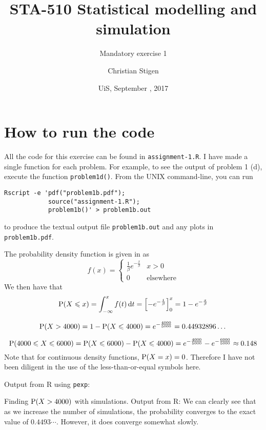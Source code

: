 \documentclass[a4paper,english,12pt]{article}
\title{STA-510 Statistical modelling and simulation}
\subtitle{Mandatory exercise 1}
\author{Christian Stigen}
\date{UiS, September \nth{21}, 2017}
\begin{document}
\maketitle


\section*{\normalsize{How to run the code}}
All the code for this exercise can be found in \texttt{assignment-1.R}. I have
made a single function for each problem. For example, to see the output of
problem 1 (d), execute the function \texttt{problem1d()}.  From the UNIX
command-line, you can run
\begin{verbatim}
Rscript -e 'pdf("problem1b.pdf");
            source("assignment-1.R");
            problem1b()' > problem1b.out
\end{verbatim}
to produce the textual output file \texttt{problem1b.out} and
any plots in \texttt{problem1b.pdf}.

The probability density function is given in \cite{walpole} as
\[
  f(x) =
    \begin{cases}
      \displaystyle
        \frac{1}{\beta} e^{-\frac{x}{\beta}} & x > 0  \\
        0 & \text{elsewhere}
    \end{cases}
\]
We then have that
\[
  \mathrm{P}(X \leqslant x) = \int_{-\infty}^{x} f(t)\, \mathrm{d}t 
    = \left[ -e^{-\frac{t}{\beta}} \right]_{0}^{x} = 1 - e^{-\frac{x}{\beta}}
\]

\[
  \mathrm{P}(X > 4000)
    = 1 - \mathrm{P}(X \leqslant 4000)
    = e^{-\frac{4000}{5000}}
    = 0.44932896\dots
\]

\[
  \mathrm{P}(4000 \leqslant X \leqslant 6000) =
    \mathrm{P}(X \leqslant 6000) - \mathrm{P}(X \leqslant 4000) =
       e^{-\frac{4000}{5000}} - e^{-\frac{6000}{5000}}
       \approx 0.148
\]
Note that for continuous density functions, $\mathrm{P}(X=x) = 0$. Therefore I have not
been diligent in the use of the less-than-or-equal symbols here.

Output from R using \texttt{pexp}:

Finding $\mathrm{P}(X > 4000)$ with simulations. Output from R:
We can clearly see that as we increase the number of simulations, the
probability converges to the exact value of $0.4493\cdots$. However, it does
converge somewhat slowly.
\end{document}
